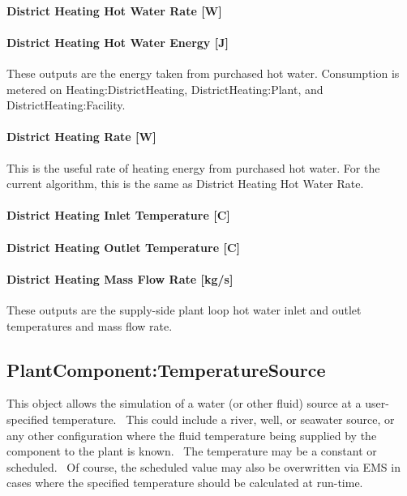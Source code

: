 \paragraph{District Heating Hot Water Rate {[}W{]}}\label{district-heating-hot-water-rate-w}

\paragraph{District Heating Hot Water Energy {[}J{]}}\label{district-heating-hot-water-energy-j}

These outputs are the energy taken from purchased hot water. Consumption is metered on Heating:DistrictHeating, DistrictHeating:Plant, and DistrictHeating:Facility.

\paragraph{District Heating Rate {[}W{]}}\label{district-heating-rate-w}

This is the useful rate of heating energy from purchased hot water. For the current algorithm, this is the same as District Heating Hot Water Rate.

\paragraph{District Heating Inlet Temperature {[}C{]}}\label{district-heating-inlet-temperature-c}

\paragraph{District Heating Outlet Temperature {[}C{]}}\label{district-heating-outlet-temperature-c}

\paragraph{District Heating Mass Flow Rate {[}kg/s{]}}\label{district-heating-mass-flow-rate-kgs}

These outputs are the supply-side plant loop hot water inlet and outlet temperatures and mass flow rate.

\subsection{PlantComponent:TemperatureSource}\label{plantcomponenttemperaturesource}

This object allows the simulation of a water (or other fluid) source at a user-specified temperature.~ This could include a river, well, or seawater source, or any other configuration where the fluid temperature being supplied by the component to the plant is known.~ The temperature may be a constant or scheduled.~ Of course, the scheduled value may also be overwritten via EMS in cases where the specified temperature should be calculated at run-time.

